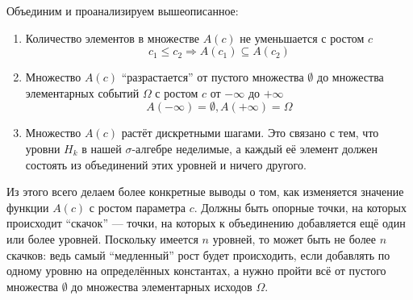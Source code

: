 Объединим и проанализируем вышеописанное:
\begin{enumerate}
  \item Количество элементов в множестве $A\left( c \right)$
      не уменьшается с ростом $c$
      $$c_1 \le c_2
      \Rightarrow A\left( c_1 \right) \subseteq A\left( c_2 \right)$$

  \item Множество $A\left( c \right)$ ``разрастается''
      от пустого множества $\emptyset$
      до множества элементарных событий $\Omega$
      с ростом $c$ от $-\infty$ до $+ \infty$
      $$A\left( -\infty \right)= \emptyset, A\left( + \infty \right)= \Omega$$

  \item Множество $A\left( c \right)$ растёт дискретными шагами.
      Это связано с тем, что уровни $H_k$ в нашей $\sigma$-алгебре неделимые,
      а каждый её элемент должен состоять из
      объединений этих уровней и ничего другого.
\end{enumerate}

Из этого всего делаем более конкретные выводы о том,
как изменяется значение функции $A\left( c \right)$ с ростом параметра $c$.
Должны быть опорные точки, на которых происходит ``скачок'' ---
точки, на которых к объединению добавляется ещё один или более уровней.
Поскольку имеется $n$ уровней, то может быть не более $n$ скачков:
ведь самый ``медленный'' рост будет происходить,
если добавлять по одному уровню на определённых константах,
а нужно пройти всё от пустого множества $\emptyset$
до множества элементарных исходов $\Omega$.

